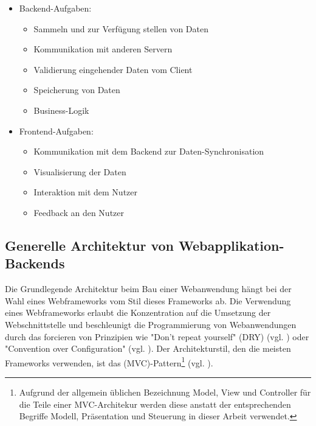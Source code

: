 \begin{itemize}
  \item Backend-Aufgaben:
  \begin{itemize}
    \item Sammeln und zur Verfügung stellen von Daten
    \item Kommunikation mit anderen Servern
    \item Validierung eingehender Daten vom Client
    \item Speicherung von Daten
    \item Business-Logik
  \end{itemize}

\item Frontend-Aufgaben:
  \begin{itemize}
    \item Kommunikation mit dem Backend zur Daten-Synchronisation 
\item Visualisierung der Daten
    \item Interaktion mit dem Nutzer
    \item Feedback an den Nutzer
  \end{itemize}
\end{itemize}

\subsection{Generelle Architektur von Webapplikation-Backends}

Die Grundlegende Architektur beim Bau einer Webanwendung hängt bei der Wahl eines Webframeworks vom Stil dieses Frameworks ab. Die Verwendung eines Webframeworks erlaubt die Konzentration auf die Umsetzung der Webschnittstelle und beschleunigt die Programmierung von Webanwendungen durch das forcieren von Prinzipien wie "Don't repeat yourself" (DRY) (vgl. \cite[p.~23]{pragmatic-programmer}) oder "Convention over Configuration" (vgl. \cite[p.~3]{maven}). Der Architekturstil, den die meisten Frameworks verwenden, ist das  (MVC)-Pattern\footnote{Aufgrund der allgemein üblichen Bezeichnung Model, View und Controller für die Teile einer MVC-Architekur werden diese anstatt der entsprechenden Begriffe Modell, Präsentation und Steuerung in dieser Arbeit verwendet.} (vgl. \cite[p.~14]{gang-of-four}). 

